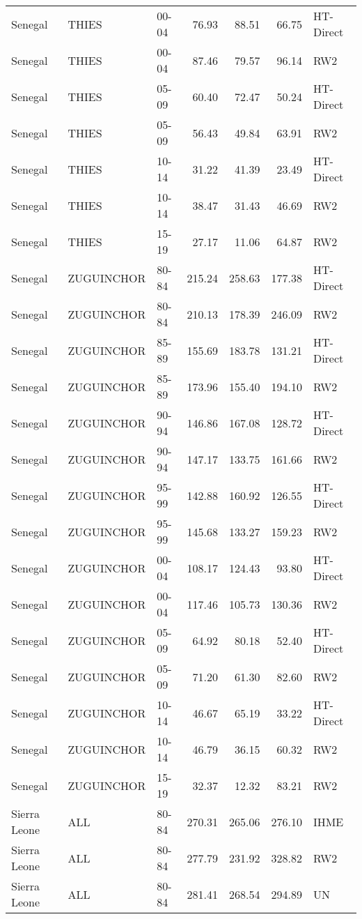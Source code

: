 \begin{longtable}{lllrrrl}
  Senegal & THIES & 00-04 & 76.93 & 88.51 & 66.75 & HT-Direct \\ 
  Senegal & THIES & 00-04 & 87.46 & 79.57 & 96.14 & RW2 \\ 
  Senegal & THIES & 05-09 & 60.40 & 72.47 & 50.24 & HT-Direct \\ 
  Senegal & THIES & 05-09 & 56.43 & 49.84 & 63.91 & RW2 \\ 
  Senegal & THIES & 10-14 & 31.22 & 41.39 & 23.49 & HT-Direct \\ 
  Senegal & THIES & 10-14 & 38.47 & 31.43 & 46.69 & RW2 \\ 
  Senegal & THIES & 15-19 & 27.17 & 11.06 & 64.87 & RW2 \\ 
  Senegal & ZUGUINCHOR & 80-84 & 215.24 & 258.63 & 177.38 & HT-Direct \\ 
  Senegal & ZUGUINCHOR & 80-84 & 210.13 & 178.39 & 246.09 & RW2 \\ 
  Senegal & ZUGUINCHOR & 85-89 & 155.69 & 183.78 & 131.21 & HT-Direct \\ 
  Senegal & ZUGUINCHOR & 85-89 & 173.96 & 155.40 & 194.10 & RW2 \\ 
  Senegal & ZUGUINCHOR & 90-94 & 146.86 & 167.08 & 128.72 & HT-Direct \\ 
  Senegal & ZUGUINCHOR & 90-94 & 147.17 & 133.75 & 161.66 & RW2 \\ 
  Senegal & ZUGUINCHOR & 95-99 & 142.88 & 160.92 & 126.55 & HT-Direct \\ 
  Senegal & ZUGUINCHOR & 95-99 & 145.68 & 133.27 & 159.23 & RW2 \\ 
  Senegal & ZUGUINCHOR & 00-04 & 108.17 & 124.43 & 93.80 & HT-Direct \\ 
  Senegal & ZUGUINCHOR & 00-04 & 117.46 & 105.73 & 130.36 & RW2 \\ 
  Senegal & ZUGUINCHOR & 05-09 & 64.92 & 80.18 & 52.40 & HT-Direct \\ 
  Senegal & ZUGUINCHOR & 05-09 & 71.20 & 61.30 & 82.60 & RW2 \\ 
  Senegal & ZUGUINCHOR & 10-14 & 46.67 & 65.19 & 33.22 & HT-Direct \\ 
  Senegal & ZUGUINCHOR & 10-14 & 46.79 & 36.15 & 60.32 & RW2 \\ 
  Senegal & ZUGUINCHOR & 15-19 & 32.37 & 12.32 & 83.21 & RW2 \\ 
  Sierra Leone & ALL & 80-84 & 270.31 & 265.06 & 276.10 & IHME \\ 
  Sierra Leone & ALL & 80-84 & 277.79 & 231.92 & 328.82 & RW2 \\ 
  Sierra Leone & ALL & 80-84 & 281.41 & 268.54 & 294.89 & UN \\ 

\end{longtable}
